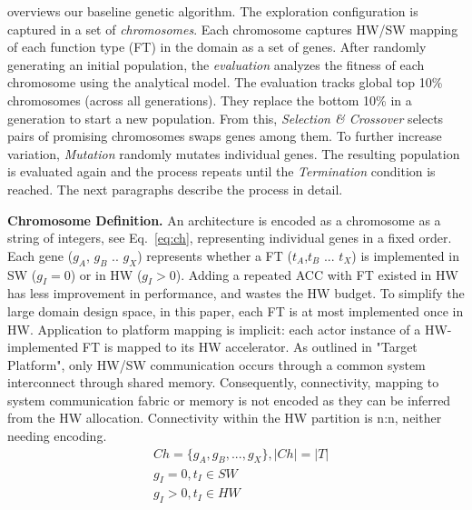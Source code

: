 
 overviews our baseline genetic algorithm. The exploration configuration is captured in a set of \emph{chromosomes}. Each chromosome captures HW/SW mapping of each function type (FT) in the domain as a set of genes. After randomly generating an initial population, the \emph{evaluation} analyzes the fitness of each chromosome using the analytical model. The evaluation tracks global top 10\% chromosomes (across all generations). They replace the bottom 10\% in a generation to start a new population. From this, \emph{Selection \& Crossover} selects pairs of promising chromosomes swaps genes among them. To further increase variation, \emph{Mutation} randomly mutates individual genes. The resulting population is evaluated again and the process repeats until the \emph{Termination} condition is reached. The next paragraphs describe the process in detail. 

\endgroup %

\textbf{Chromosome Definition.} An architecture is encoded as a chromosome as a string of integers, see Eq.~\eqref{eq:ch}, representing individual genes in a fixed order. Each gene ($g_A$, $g_B$ .. $g_X$) represents whether a FT ($t_{A}$,$t_{B}$ ... $t_{X}$) is implemented in SW ($g_{I} = 0$) or in HW ($g_{I} > 0$). Adding a repeated ACC with FT existed in HW has less improvement in performance, and wastes the HW budget. To simplify the large domain design space, in this paper, each FT is at most implemented once in HW. Application to platform mapping is implicit: each actor instance of a HW-implemented FT is mapped to its HW accelerator.
As outlined in  "Target Platform", only HW/SW communication occurs through a common system interconnect through shared memory. Consequently, connectivity, mapping to system communication fabric or memory is not encoded as they can be inferred from the HW allocation. Connectivity within the HW partition is n:n, neither needing encoding.
%
\begin{equation}
\begin{split}
\label{eq:ch}
&Ch = \{g_A, g_B, ..., g_X \}, \left\vert{Ch}\right\vert = \left\vert{T}\right\vert \\
&g_{I} = 0, t_{I} \in SW \\
&g_{I} > 0, t_{I} \in HW \\
\end{split}
\end{equation}


